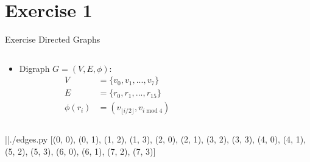 
\section{Exercise 1}

\setcounter{exercise}{1}

\begin{frame}{Exercise \thesection}{Directed Graphs}
  \begin{exercisenoinc}
    \begin{columns}
      \begin{column}{0.5\textwidth}
        \begin{itemize}
          \item Digraph $G=\left(V,E,\phi\right)$:
          \begin{align*}
            V &= \{v_0, v_1, ..., v_7\} \\
            E &= \{r_0, r_1, ..., r_{15} \} \\
            \phi(r_i) &= (v_{\lfloor i / 2\rfloor}, v_{i \; \text{mod} \; 4})
          \end{align*}
        \end{itemize}
      \end{column}
      \begin{column}{0.5\textwidth}
      \end{column}
    \end{columns}
  \end{exercisenoinc}
  \begin{requirementsnoinc}
    \centering
    \begin{minipage}{0.6\textwidth}
      \begin{linenums}
      \end{linenums}
    \end{minipage}
    \begin{terminal}
      |\prompt|./edges.py
      [(0, 0), (0, 1), (1, 2), (1, 3), (2, 0), (2, 1), (3, 2), (3, 3), 
       (4, 0), (4, 1), (5, 2), (5, 3), (6, 0), (6, 1), (7, 2), (7, 3)]
    \end{terminal}
  \end{requirementsnoinc}
\end{frame}
